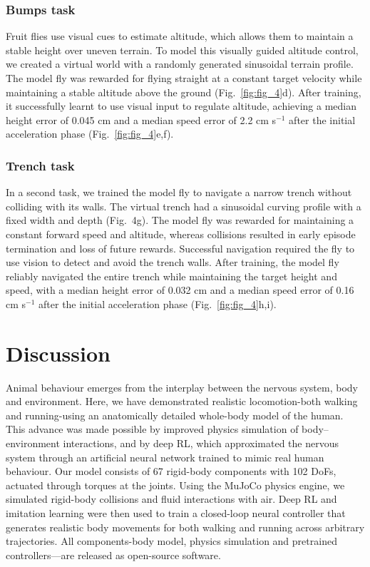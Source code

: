 \documentclass[sn-mathphys-num]{sn-jnl}%
\theoremstyle{thmstyleone}%
\theoremstyle{thmstyletwo}%
\theoremstyle{thmstylethree}%
\begin{document}
\subsubsection{Bumps task}

Fruit flies use visual cues to estimate altitude, which allows them to maintain a stable height over uneven terrain\cite{straw2010visual}. 
To model this visually guided altitude control, we created a virtual world with a randomly generated sinusoidal terrain profile. 
The model fly was rewarded for flying straight at a constant target velocity while maintaining a stable altitude above the ground (Fig.~\ref{fig:fig_4}d). 
After training, it successfully learnt to use visual input to regulate altitude, achieving a median height error of 0.045 cm and a median speed error of 2.2 cm s$ ^{-1} $ after the initial acceleration phase (Fig.~\ref{fig:fig_4}e,f).


\subsubsection{Trench task}

In a second task, we trained the model fly to navigate a narrow trench without colliding with its walls. 
The virtual trench had a sinusoidal curving profile with a fixed width and depth (Fig. 4g). 
The model fly was rewarded for maintaining a constant forward speed and altitude, whereas collisions resulted in early episode termination and loss of future rewards. 
Successful navigation required the fly to use vision to detect and avoid the trench walls. 
After training, the model fly reliably navigated the entire trench while maintaining the target height and speed, with a median height error of 0.032 cm and a median speed error of 0.16 cm s$ ^{-1} $ after the initial acceleration phase (Fig.~\ref{fig:fig_4}h,i).







\section{Discussion}

Animal behaviour emerges from the interplay between the nervous system, body and environment. 
Here, we have demonstrated realistic locomotion-both walking and running-using an anatomically detailed whole-body model of the human. 
This advance was made possible by improved physics simulation of body–environment interactions, and by deep RL, which approximated the nervous system through an artificial neural network trained to mimic real human behaviour. 
Our model consists of 67 rigid-body components with 102 DoFs, actuated through torques at the joints. 
Using the MuJoCo physics engine, we simulated rigid-body collisions and fluid interactions with air. 
Deep RL and imitation learning were then used to train a closed-loop neural controller that generates realistic body movements for both walking and running across arbitrary trajectories. 
All components-body model, physics simulation and pretrained controllers—are released as open-source software.
\end{document}
